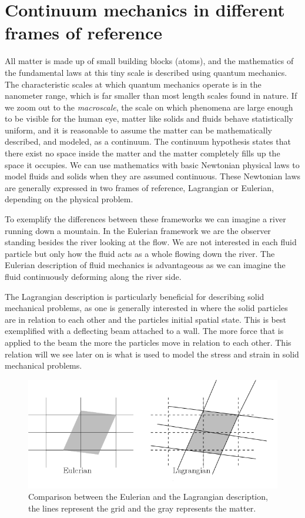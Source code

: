 \chapter{Continuum mechanics in different frames of reference}
All matter is made up of small building blocks (atoms), and the mathematics of the fundamental laws at this tiny scale is described using quantum mechanics. The characteristic scales at which quantum mechanics operate is in the nanometer range, which is far smaller than most length scales found in nature.
If we zoom out to the \textit{macroscale}, the scale on which phenomena are large enough to be visible for the human eye, matter like solids and fluids behave statistically uniform, and it is reasonable to assume the matter can be mathematically described, and modeled, as a continuum. The continuum hypothesis states that there exist no space inside the matter and the matter completely fills up the space it occupies. 
We can use mathematics with basic Newtonian physical laws to model fluids and solids when they are assumed continuous. These Newtonian laws are generally expressed in two frames of reference, Lagrangian or Eulerian, depending on the physical problem. \newline

To exemplify the differences between these frameworks we can imagine a river running down a mountain.	
In the Eulerian framework we are the observer standing besides the river looking at the flow. We are not interested in each fluid particle but only how the fluid acts as a whole flowing down the river. The Eulerian description of fluid mechanics is advantageous as we can imagine the fluid continuously deforming along the river side. \newline

The Lagrangian description is particularly beneficial for describing solid mechanical problems, as one is generally interested in where the solid particles are in relation to each other and the particles initial spatial state.  
This is best exemplified with a deflecting beam attached to a wall. The more force that is applied to the beam the more the particles move in relation to each other. This relation will we see later on is what is used to model the stress and strain in solid mechanical problems.
\newline

\begin{figure}[H]
\label{pic:E_L}
\includegraphics[scale=0.50]{./Continuum_mechanics/E_L.png}
\caption{Comparison between the Eulerian and the Lagrangian description, the lines represent the grid and the gray represents the matter.}
\end{figure}

